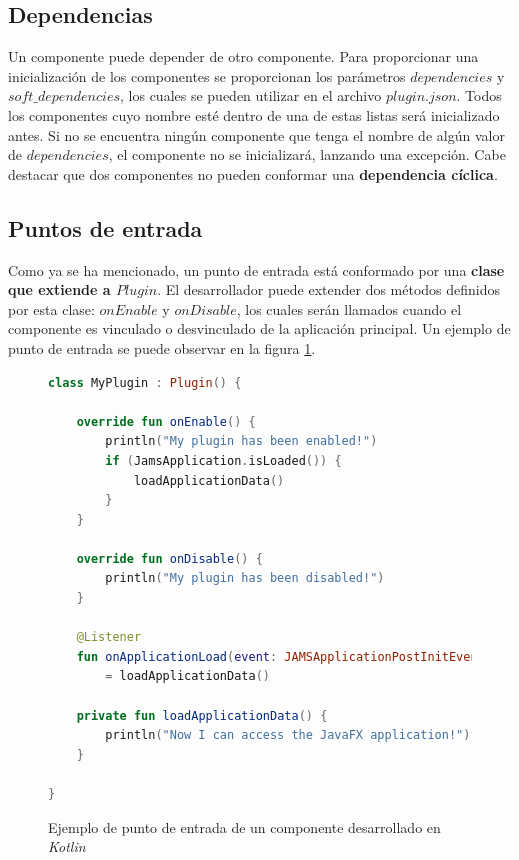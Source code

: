 \subsection{Dependencias}\label{subsec:dependencias}

Un componente puede depender de otro componente.
Para proporcionar una inicialización  de los componentes
 se proporcionan los parámetros $dependencies$
y $soft\_dependencies$, los cuales se pueden utilizar en
el archivo $plugin.json$.
Todos los componentes cuyo nombre esté dentro de una de estas
listas será inicializado antes.
Si no se encuentra ningún componente que tenga el nombre
de algún valor de $dependencies$, el componente no
se inicializará, lanzando una excepción.
Cabe destacar que dos componentes no pueden conformar
una \textbf{dependencia cíclica}.

\subsection{Puntos de entrada}\label{subsec:puntos-de-entrada}

Como ya se ha mencionado, un punto de entrada está conformado
por una \textbf{clase que extiende a $Plugin$}.
El desarrollador puede extender dos métodos definidos por esta clase:
$onEnable$ y $onDisable$, los cuales serán llamados cuando el
componente es vinculado o desvinculado de la aplicación principal.
Un ejemplo de punto de entrada se puede observar en la figura \ref{fig:entry-point}.

\begin{figure}[h]
    \centering
    \begin{lstlisting}[frame=single,label={lst:entry-point},language=Kotlin]
class MyPlugin : Plugin() {

    override fun onEnable() {
        println("My plugin has been enabled!")
        if (JamsApplication.isLoaded()) {
            loadApplicationData()
        }
    }

    override fun onDisable() {
        println("My plugin has been disabled!")
    }

    @Listener
    fun onApplicationLoad(event: JAMSApplicationPostInitEvent)
        = loadApplicationData()

    private fun loadApplicationData() {
        println("Now I can access the JavaFX application!")
    }

}
    \end{lstlisting}
    \caption{Ejemplo de punto de entrada de un componente desarrollado en \textit{Kotlin}}
    \label{fig:entry-point}
\end{figure}

